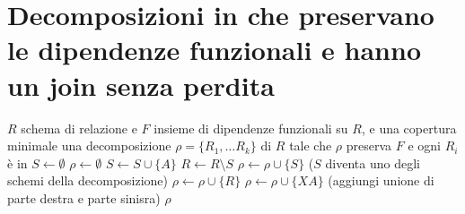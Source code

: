 \section{Decomposizioni in  che preservano le dipendenze funzionali e hanno un join senza perdita}

\begin{algorithm}
\caption{Algoritmo per la creazione di una decomposizione $\rho$ di $R$ che preserva $F$ e \`e in }
\label{algoritmo_definitivo}
\begin{algorithmic}
\Require $R$ schema di relazione e $F$ insieme di dipendenze funzionali su $R$, e una copertura minimale
\Ensure una decomposizione $\rho = \{ R_1, \dots R_k\}$ di $R$ tale che $\rho$ preserva $F$ e ogni $R_i$ \`e in 
\State $S \gets \emptyset$
\State $\rho \gets \emptyset$
    \State $S \gets S \cup \{ A \}$
\EndFor
{}
    \State $R \gets R \setminus S$
    \State $\rho \gets \rho \cup \{ S \}$ ($S$ diventa uno degli schemi della decomposizione)
\EndIf
{}
    \State $\rho \gets \rho \cup \{ R \}$
\Else
        \State $\rho \gets \rho \cup \{ XA \}$ (aggiungi unione di parte destra e parte sinisra)
    \EndFor
\EndIf
\State \Return $\rho$
\end{algorithmic}
\end{algorithm}

